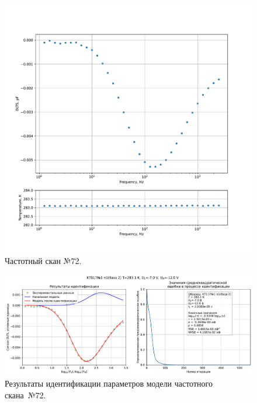 \begin{figure}[!ht]
    \centering
    \includegraphics[width=1\textwidth]{../plots/КТ117№1_п1(база 2)_2500Гц-1Гц_1пФ_+10С_-7В-12В_100мВ_20мкс_шаг_0,1.pdf}
    \caption{Частотный скан №72.}
    \label{pic:frequency_scan_72}
\end{figure}

\begin{figure}[!ht]
    \centering
    \includegraphics[width=1\textwidth]{../plots/КТ117№1_п1(база 2)_2500Гц-1Гц_1пФ_+10С_-7В-12В_100мВ_20мкс_шаг_0,1_model.pdf}
    \caption{Результаты идентификации параметров модели частотного скана~№72.}
    \label{pic:frequency_scan_model72}
\end{figure}

\pagebreak


